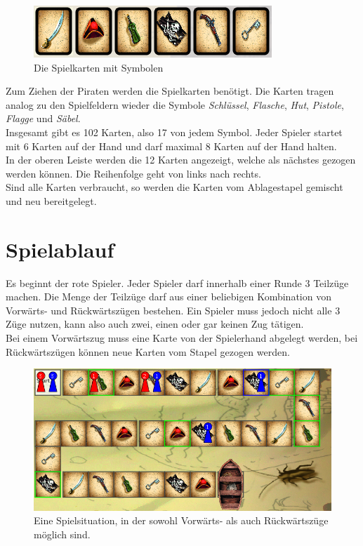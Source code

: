 \documentclass[a4paper, ngerman]{scrartcl}
\begin{document}
	\begin{figure}[h]
		\centering
		\includegraphics[scale = 0.5]{bilder/Karten}
		\caption{Die Spielkarten mit Symbolen}
	\end{figure}
	Zum Ziehen der Piraten werden die Spielkarten benötigt. Die Karten tragen
	analog zu den Spielfeldern wieder die Symbole \emph{Schlüssel}, \emph{Flasche}, \emph{Hut},
	\emph{Pistole}, \emph{Flagge} und \emph{Säbel}.\\
	Insgesamt gibt es 102 Karten, also 17 von jedem Symbol. Jeder Spieler startet
	mit 6 Karten auf der Hand und darf maximal 8 Karten auf der Hand halten.\\
	In der oberen Leiste werden die 12 Karten angezeigt, welche als
	nächstes gezogen werden können. Die Reihenfolge geht von links nach rechts.\\
	Sind alle Karten verbraucht, so werden die Karten vom Ablagestapel gemischt und
	neu bereitgelegt.
\section{Spielablauf}
	Es beginnt der rote Spieler. Jeder Spieler darf innerhalb einer Runde 3
	Teilzüge machen. Die Menge der Teilzüge darf aus einer beliebigen Kombination
	von Vorwärts- und Rückwärtszügen bestehen. Ein Spieler muss jedoch nicht alle 3
	Züge nutzen, kann also auch zwei, einen oder gar keinen Zug tätigen.\\
	Bei einem Vorwärtszug muss eine Karte von der Spielerhand abgelegt werden, bei
	Rückwärtszügen können neue Karten vom Stapel gezogen werden.
	
	\begin{figure}[h!]
		\label{fig:PossibleMoves}
		\centering
		\includegraphics[scale = 0.5]{bilder/Moves}
		\caption{Eine Spielsituation, in der sowohl Vorwärts- als auch Rückwärtszüge
		möglich sind.}
	\end{figure}
	
\end{document}
